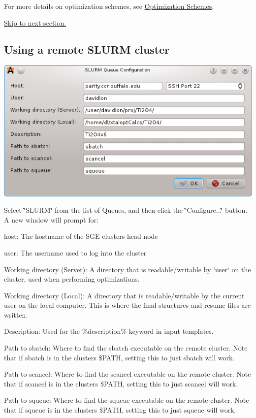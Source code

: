 For more details on optimization schemes, see \hyperlink{optschemes}{Optimization Schemes}.

\hyperlink{tut-xo_files}{Skip to next section.}\hypertarget{tut-xo_remoteslurm}{}\subsection{Using a remote S\+L\+U\+R\+M cluster}\label{tut-xo_remoteslurm}
 
\begin{DoxyImageNoCaption}
  \mbox{\includegraphics[width=\textwidth]{opt-set-slurm.png}}
\end{DoxyImageNoCaption}


Select \char`\"{}\+S\+L\+U\+R\+M\char`\"{} from the list of Queues, and then click the \char`\"{}\+Configure...\char`\"{} button. A new window will prompt for\+:
\begin{DoxyItemize}
\item host\+: The hostname of the S\+G\+E cluster\textquotesingle{}s head node
\item user\+: The username used to log into the cluster
\item Working directory (Server)\+: A directory that is readable/writable by \char`\"{}user\char`\"{} on the cluster, used when performing optimizations.
\item Working directory (Local)\+: A directory that is readable/writable by the current user on the local computer. This is where the final structures and resume files are written.
\item Description\+: Used for the \%description\% keyword in input templates.
\item Path to sbatch\+: Where to find the sbatch executable on the remote cluster. Note that if sbatch is in the cluster\textquotesingle{}s \$\+P\+A\+T\+H, setting this to just \textquotesingle{}sbatch\textquotesingle{} will work.
\item Path to scancel\+: Where to find the scancel executable on the remote cluster. Note that if scancel is in the cluster\textquotesingle{}s \$\+P\+A\+T\+H, setting this to just \textquotesingle{}scancel\textquotesingle{} will work.
\item Path to squeue\+: Where to find the squeue executable on the remote cluster. Note that if squeue is in the cluster\textquotesingle{}s \$\+P\+A\+T\+H, setting this to just \textquotesingle{}squeue\textquotesingle{} will work.
\end{DoxyItemize}

